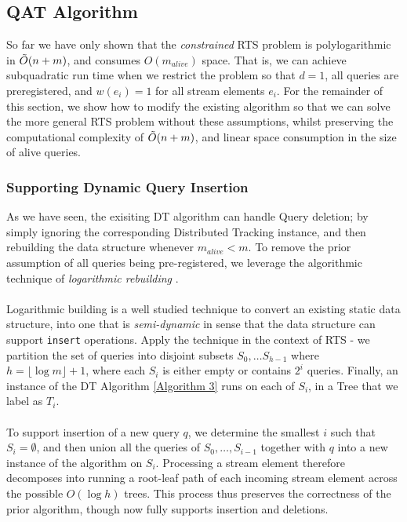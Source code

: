 \subsection{QAT Algorithm}

So far we have only shown that the \textit{constrained} RTS problem is polylogarithmic in $\Tilde{O}(n+m)$, and consumes $O(m_{alive})$ space. That is, we can achieve subquadratic run time when we restrict the problem so that $d=1$, all queries are preregistered, and $w(e_i) = 1$ for all stream elements $e_i$. For the remainder of this section, we show how to modify the existing algorithm so that we can solve the more general RTS problem without these assumptions, whilst preserving the computational complexity of $\Tilde{O}(n+m)$, and linear space consumption in the size of alive queries.

\subsubsection*{Supporting Dynamic Query Insertion}
As we have seen, the exisiting DT algorithm can handle Query deletion; by simply ignoring the corresponding Distributed Tracking instance, and then rebuilding the data structure whenever $m_{alive} < m$. To remove the prior assumption of all queries being pre-registered, we leverage the algorithmic technique of \textit{logarithmic rebuilding} \cite{BENTLEY}. \\
\\
Logarithmic building is a well studied technique to convert an existing static data structure, into one that is \textit{semi-dynamic} in sense that the data structure can support \texttt{insert} operations. Apply the technique in the context of RTS - we partition the set of queries into disjoint subsets $S_0, \dots S_{h-1}$ where $h = \lfloor \log m\rfloor+1$, where each $S_i$ is either empty or contains $2^i$ queries. Finally, an instance of the DT Algorithm \ref{Algorithm 3} runs on each of $S_i$, in a Tree that we label as $T_i$. \\
\\
To support insertion of a new query $q$, we determine the smallest $i$ such that $S_i = \emptyset$, and then union all the queries of $S_0, \dots, S_{i-1}$ together with $q$ into a new instance of the algorithm on $S_i$. Processing a stream element therefore decomposes into running a root-leaf path of each incoming stream element across the possible $O(\log h)$ trees. This process thus preserves the correctness of the prior algorithm, though now fully supports insertion and deletions. 

